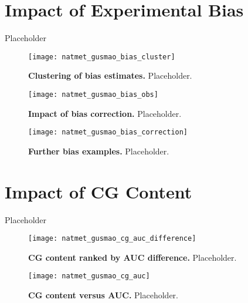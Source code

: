\section{Impact of Experimental Bias}
\label{sec:impact.experimental.bias}

Placeholder

\begin{figure}[h!]
\centering
\texttt{[image: natmet\_gusmao\_bias\_cluster]}
\caption[Clustering of bias estimates]{\textbf{Clustering of bias estimates.} Placeholder.}
\label{fig:natmet_gusmao_bias_cluster}
\end{figure}

\begin{figure}[h!]
\centering
\texttt{[image: natmet\_gusmao\_bias\_obs]}
\caption[Impact of bias correction]{\textbf{Impact of bias correction.} Placeholder.}
\label{fig:natmet_gusmao_bias_obs}
\end{figure}

\begin{figure}[h!]
\centering
\texttt{[image: natmet\_gusmao\_bias\_correction]}
\caption[Further bias examples]{\textbf{Further bias examples.} Placeholder.}
\label{fig:natmet_gusmao_bias_correction}
\end{figure}

\section{Impact of CG Content}
\label{sec:impact.cg.content}

Placeholder

\begin{figure}[h!]
\centering
\texttt{[image: natmet\_gusmao\_cg\_auc\_difference]}
\caption[CG content ranked by AUC difference]{\textbf{CG content ranked by AUC difference.} Placeholder.}
\label{fig:natmet_gusmao_cg_auc_difference}
\end{figure}

\begin{figure}[h!]
\centering
\texttt{[image: natmet\_gusmao\_cg\_auc]}
\caption[CG content versus AUC]{\textbf{CG content versus AUC.} Placeholder.}
\label{fig:natmet_gusmao_cg_auc}
\end{figure}

